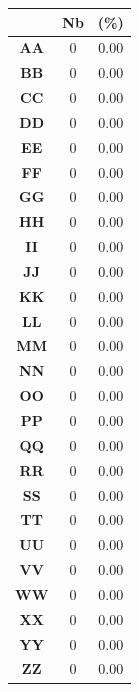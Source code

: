 \documentclass[a4paper, titlepage]{livret}
\begin{document}
\begin{center}
\begin{minipage}[c]{.3\linewidth}
\begin{tabular}{|c|c|c|}
	\hline
\end{tabular}
  \label{tab98}
\end{minipage}
\begin{minipage}[c]{.3\linewidth}
 \begin{tabular}{|c|c|c|}
 \hline
	& \textbf{Nb} & \textbf{(\%)}\\
	\hline
	\textbf{AA} &       0 &  0.00\\
	\hline
	\textbf{BB} &       0 &  0.00\\
	\hline
	\textbf{CC} &       0 &  0.00\\
	\hline
	\textbf{DD} &       0 &  0.00\\
	\hline
	\textbf{EE} &       0 &  0.00\\
	\hline
	\textbf{FF} &       0 &  0.00\\
	\hline
	\textbf{GG} &       0 &  0.00\\
	\hline
	\textbf{HH} &       0 &  0.00\\
	\hline
	\textbf{II} &       0 &  0.00\\
	\hline
	\textbf{JJ} &       0 &  0.00\\
	\hline
	\textbf{KK} &       0 &  0.00\\
	\hline
	\textbf{LL} &       0 &  0.00\\
	\hline
	\textbf{MM} &       0 &  0.00\\
	\hline
	\textbf{NN} &       0 &  0.00\\
	\hline
	\textbf{OO} &       0 &  0.00\\
	\hline
	\textbf{PP} &       0 &  0.00\\
	\hline
	\textbf{QQ} &       0 &  0.00\\
	\hline
	\textbf{RR} &       0 &  0.00\\
	\hline
	\textbf{SS} &       0 &  0.00\\
	\hline
	\textbf{TT} &       0 &  0.00\\
	\hline
	\textbf{UU} &       0 &  0.00\\
	\hline
	\textbf{VV} &       0 &  0.00\\
	\hline
	\textbf{WW} &       0 &  0.00\\
	\hline
	\textbf{XX} &       0 &  0.00\\
	\hline
	\textbf{YY} &       0 &  0.00\\
	\hline
	\textbf{ZZ} &       0 &  0.00\\
	\hline
\end{tabular}
  \label{tab25}
\end{minipage}
\end{center}
\end{document}
